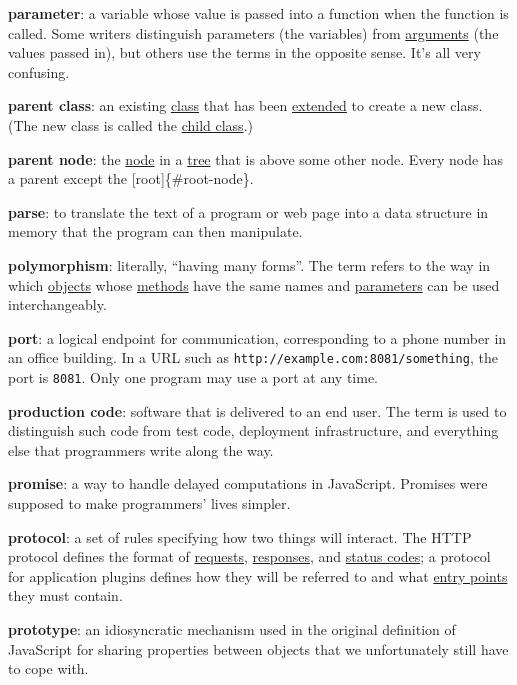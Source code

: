 \textbf{parameter}: a variable whose value is passed into a function
when the function is called. Some writers distinguish parameters (the
variables) from \protect\hyperlink{g:argument}{arguments} (the values
passed in), but others use the terms in the opposite sense. It's all
very confusing.

\textbf{parent class}: an existing \protect\hyperlink{g:class}{class}
that has been \protect\hyperlink{g:extend}{extended} to create a new
class. (The new class is called the
\protect\hyperlink{g:child-class}{child class}.)

\textbf{parent node}: the \protect\hyperlink{g:node}{node} in a
\protect\hyperlink{g:tree}{tree} that is above some other node. Every
node has a parent except the {[}root{]}\{\#root-node\}.

\textbf{parse}: to translate the text of a program or web page into a
data structure in memory that the program can then manipulate.

\textbf{polymorphism}: literally, ``having many forms''. The term refers
to the way in which \protect\hyperlink{g:object}{objects} whose
\protect\hyperlink{g:method}{methods} have the same names and
\protect\hyperlink{g:parameter}{parameters} can be used interchangeably.

\textbf{port}: a logical endpoint for communication, corresponding to a
phone number in an office building. In a URL such as
\texttt{http://example.com:8081/something}, the port is \texttt{8081}.
Only one program may use a port at any time.

\textbf{production code}: software that is delivered to an end user. The
term is used to distinguish such code from test code, deployment
infrastructure, and everything else that programmers write along the
way.

\textbf{promise}: a way to handle delayed computations in JavaScript.
Promises were supposed to make programmers' lives simpler.

\textbf{protocol}: a set of rules specifying how two things will
interact. The HTTP protocol defines the format of
\protect\hyperlink{g:http-request}{requests},
\protect\hyperlink{g:http-response}{responses}, and
\protect\hyperlink{g:http-status-code}{status codes}; a protocol for
application plugins defines how they will be referred to and what
\protect\hyperlink{g:entry-point}{entry points} they must contain.

\textbf{prototype}: an idiosyncratic mechanism used in the original
definition of JavaScript for sharing properties between objects that we
unfortunately still have to cope with.

